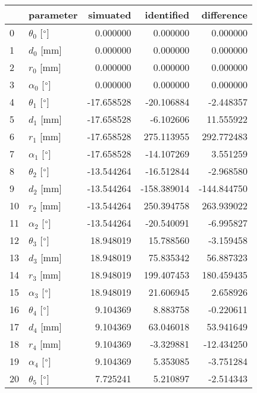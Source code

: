 \documentclass{standalone}%
\begin{document}
%
\normalsize%
\begin{tabular}{llrrr}
\toprule
{} &                 parameter &   simuated &  identified &  difference \\
\midrule
0  &  $\theta_{0}$ [$\degree$] &   0.000000 &    0.000000 &    0.000000 \\
1  &              $d_{0}$ [mm] &   0.000000 &    0.000000 &    0.000000 \\
2  &              $r_{0}$ [mm] &   0.000000 &    0.000000 &    0.000000 \\
3  &  $\alpha_{0}$ [$\degree$] &   0.000000 &    0.000000 &    0.000000 \\
4  &  $\theta_{1}$ [$\degree$] & -17.658528 &  -20.106884 &   -2.448357 \\
5  &              $d_{1}$ [mm] & -17.658528 &   -6.102606 &   11.555922 \\
6  &              $r_{1}$ [mm] & -17.658528 &  275.113955 &  292.772483 \\
7  &  $\alpha_{1}$ [$\degree$] & -17.658528 &  -14.107269 &    3.551259 \\
8  &  $\theta_{2}$ [$\degree$] & -13.544264 &  -16.512844 &   -2.968580 \\
9  &              $d_{2}$ [mm] & -13.544264 & -158.389014 & -144.844750 \\
10 &              $r_{2}$ [mm] & -13.544264 &  250.394758 &  263.939022 \\
11 &  $\alpha_{2}$ [$\degree$] & -13.544264 &  -20.540091 &   -6.995827 \\
12 &  $\theta_{3}$ [$\degree$] &  18.948019 &   15.788560 &   -3.159458 \\
13 &              $d_{3}$ [mm] &  18.948019 &   75.835342 &   56.887323 \\
14 &              $r_{3}$ [mm] &  18.948019 &  199.407453 &  180.459435 \\
15 &  $\alpha_{3}$ [$\degree$] &  18.948019 &   21.606945 &    2.658926 \\
16 &  $\theta_{4}$ [$\degree$] &   9.104369 &    8.883758 &   -0.220611 \\
17 &              $d_{4}$ [mm] &   9.104369 &   63.046018 &   53.941649 \\
18 &              $r_{4}$ [mm] &   9.104369 &   -3.329881 &  -12.434250 \\
19 &  $\alpha_{4}$ [$\degree$] &   9.104369 &    5.353085 &   -3.751284 \\
20 &  $\theta_{5}$ [$\degree$] &   7.725241 &    5.210897 &   -2.514343 \\

\end{tabular}
\end{document}
